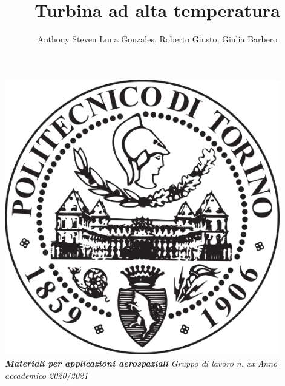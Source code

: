 \documentclass{article}
\author{Anthony Steven Luna Gonzales, Roberto Giusto, Giulia Barbero}
\title{Turbina ad alta temperatura}
\begin{document}
    \maketitle
    \begin{center}
        \includegraphics[width=0.9\textwidth]{Sources/polito_logo.png}\linebreak\newline
       \textbf{\textit{Materiali per applicazioni aerospaziali}}\linebreak\newline
        \textit{Gruppo di lavoro n. xx}\linebreak\newline
        \textit{Anno accademico 2020/2021}
    \end{center}

    \newpage
\end{document}
